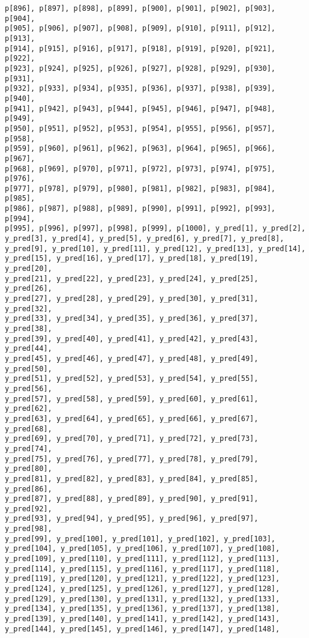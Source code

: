 \documentclass[
  letterpaper,
  DIV=11,
  numbers=noendperiod]{scrartcl}
\begin{document}
\begin{verbatim}
p[896], p[897], p[898], p[899], p[900], p[901], p[902], p[903], p[904],
p[905], p[906], p[907], p[908], p[909], p[910], p[911], p[912], p[913],
p[914], p[915], p[916], p[917], p[918], p[919], p[920], p[921], p[922],
p[923], p[924], p[925], p[926], p[927], p[928], p[929], p[930], p[931],
p[932], p[933], p[934], p[935], p[936], p[937], p[938], p[939], p[940],
p[941], p[942], p[943], p[944], p[945], p[946], p[947], p[948], p[949],
p[950], p[951], p[952], p[953], p[954], p[955], p[956], p[957], p[958],
p[959], p[960], p[961], p[962], p[963], p[964], p[965], p[966], p[967],
p[968], p[969], p[970], p[971], p[972], p[973], p[974], p[975], p[976],
p[977], p[978], p[979], p[980], p[981], p[982], p[983], p[984], p[985],
p[986], p[987], p[988], p[989], p[990], p[991], p[992], p[993], p[994],
p[995], p[996], p[997], p[998], p[999], p[1000], y_pred[1], y_pred[2],
y_pred[3], y_pred[4], y_pred[5], y_pred[6], y_pred[7], y_pred[8],
y_pred[9], y_pred[10], y_pred[11], y_pred[12], y_pred[13], y_pred[14],
y_pred[15], y_pred[16], y_pred[17], y_pred[18], y_pred[19], y_pred[20],
y_pred[21], y_pred[22], y_pred[23], y_pred[24], y_pred[25], y_pred[26],
y_pred[27], y_pred[28], y_pred[29], y_pred[30], y_pred[31], y_pred[32],
y_pred[33], y_pred[34], y_pred[35], y_pred[36], y_pred[37], y_pred[38],
y_pred[39], y_pred[40], y_pred[41], y_pred[42], y_pred[43], y_pred[44],
y_pred[45], y_pred[46], y_pred[47], y_pred[48], y_pred[49], y_pred[50],
y_pred[51], y_pred[52], y_pred[53], y_pred[54], y_pred[55], y_pred[56],
y_pred[57], y_pred[58], y_pred[59], y_pred[60], y_pred[61], y_pred[62],
y_pred[63], y_pred[64], y_pred[65], y_pred[66], y_pred[67], y_pred[68],
y_pred[69], y_pred[70], y_pred[71], y_pred[72], y_pred[73], y_pred[74],
y_pred[75], y_pred[76], y_pred[77], y_pred[78], y_pred[79], y_pred[80],
y_pred[81], y_pred[82], y_pred[83], y_pred[84], y_pred[85], y_pred[86],
y_pred[87], y_pred[88], y_pred[89], y_pred[90], y_pred[91], y_pred[92],
y_pred[93], y_pred[94], y_pred[95], y_pred[96], y_pred[97], y_pred[98],
y_pred[99], y_pred[100], y_pred[101], y_pred[102], y_pred[103],
y_pred[104], y_pred[105], y_pred[106], y_pred[107], y_pred[108],
y_pred[109], y_pred[110], y_pred[111], y_pred[112], y_pred[113],
y_pred[114], y_pred[115], y_pred[116], y_pred[117], y_pred[118],
y_pred[119], y_pred[120], y_pred[121], y_pred[122], y_pred[123],
y_pred[124], y_pred[125], y_pred[126], y_pred[127], y_pred[128],
y_pred[129], y_pred[130], y_pred[131], y_pred[132], y_pred[133],
y_pred[134], y_pred[135], y_pred[136], y_pred[137], y_pred[138],
y_pred[139], y_pred[140], y_pred[141], y_pred[142], y_pred[143],
y_pred[144], y_pred[145], y_pred[146], y_pred[147], y_pred[148],

\end{verbatim}
\end{document}
